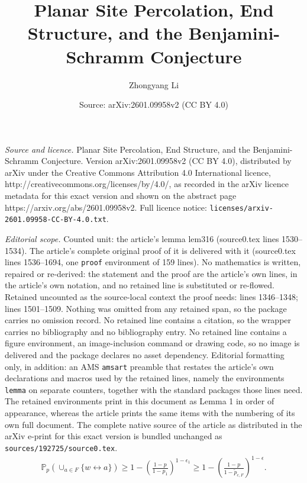 \documentclass[10pt,a4paper]{amsart}
\title{Planar Site Percolation, End Structure, and the Benjamini-Schramm Conjecture}
\author{Zhongyang Li}
\date{Source: arXiv:2601.09958v2 (CC BY 4.0)}
\begin{document}
\maketitle

\noindent\emph{Source and licence.} Planar Site Percolation, End Structure, and the Benjamini-Schramm Conjecture. Version arXiv:2601.09958v2 (CC BY 4.0), distributed by arXiv under the Creative Commons Attribution 4.0 International licence, http://creativecommons.org/licenses/by/4.0/, as recorded in the arXiv licence metadata for this exact version and shown on the abstract page https://arxiv.org/abs/2601.09958v2. Full licence notice: \texttt{licenses/arxiv-2601.09958-CC-BY-4.0.txt}.\par\smallskip

\noindent\textit{Editorial scope.} Counted unit: the article's lemma lem316 (source0.tex lines 1530--1534). The article's complete original proof of it is delivered with it (source0.tex lines 1536--1694, one \texttt{proof} environment of 159 lines). No mathematics is written, repaired or re-derived: the statement and the proof are the article's own lines, in the article's own notation, and no retained line is substituted or re-flowed.  Retained uncounted as the source-local context the proof needs: lines 1346--1348; lines 1501--1509.  Nothing was omitted from any retained span, so the package carries no omission record.  No retained line contains a citation, so the wrapper carries no bibliography and no bibliography entry.  No retained line contains a figure environment, an image-inclusion command or drawing code, so no image is delivered and the package declares no asset dependency.  Editorial formatting only, in addition: an AMS \texttt{amsart} preamble that restates the article's own declarations and macros used by the retained lines, namely the environments \texttt{lemma} on separate counters, together with the standard packages those lines need.  The retained environments print in this document as Lemma 1 in order of appearance, whereas the article prints the same items with the numbering of its own full document.  The complete native source of the article as distributed in the arXiv e-print for this exact version is bundled unchanged as \texttt{sources/192725/source0.tex}.
    \begin{align}
    \mathbb{P}_p(\cup_{a\in  F}\{w\leftrightarrow a\})\geq 1-\left(\frac{1-p}{1-p_1}\right)^{1-\epsilon_1}\geq 1-\left(\frac{1-p}{1-\tilde{p}_{c,F}}\right)^{1-\epsilon}.\label{lbi2}
    \end{align}
\end{document}
